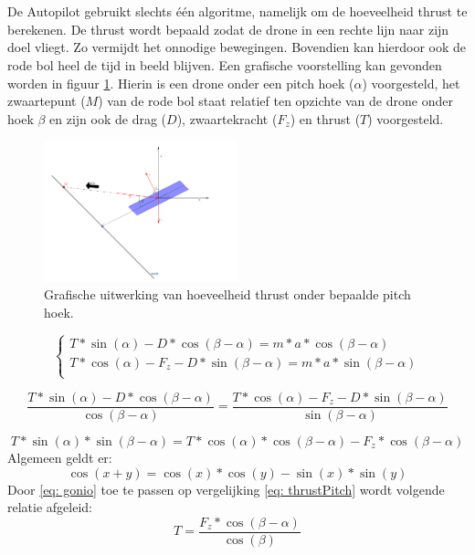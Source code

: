 \\
\\
De Autopilot gebruikt slechts één algoritme, namelijk om de hoeveelheid thrust te berekenen. De thrust wordt bepaald zodat de drone in een rechte lijn naar zijn doel vliegt. Zo vermijdt het onnodige bewegingen. Bovendien kan hierdoor ook de rode bol heel de tijd in beeld blijven. Een grafische voorstelling kan gevonden worden in figuur \ref{fig:GrafischeUitwerkingVanHoeveelheidThrustOnderBepaaldePitch}. Hierin is een drone onder een pitch hoek (\(\alpha\)) voorgesteld, het zwaartepunt (\(M\)) van de rode bol staat relatief ten opzichte van de drone onder hoek \(\beta\) en zijn ook de drag (\(D\)), zwaartekracht (\(F_z\)) en thrust (\(T\)) voorgesteld.

\begin{figure}[h]
	\centering
	\includegraphics[width=0.5\textwidth]{GrafischeUitwerkingVanHoeveelheidThrustOnderBepaaldePitch.png}
	\caption{Grafische uitwerking van hoeveelheid thrust onder bepaalde pitch hoek.}
	\label{fig:GrafischeUitwerkingVanHoeveelheidThrustOnderBepaaldePitch}
\end{figure}

\begin{equation}
\begin{cases}
T*\sin(\alpha)-D*\cos(\beta-\alpha) = m*a*\cos(\beta-\alpha)\\
T*\cos(\alpha) - F_z - D*\sin(\beta-\alpha) = m*a*\sin(\beta-\alpha)\\
\end{cases}
\end{equation}

\begin{equation}
\frac{T*\sin(\alpha)-D*\cos(\beta-\alpha)}{\cos(\beta-\alpha)} = \frac{T*\cos(\alpha) - F_z - D*\sin(\beta-\alpha)}{\sin(\beta-\alpha)}
\end{equation}

\begin{equation} \label{eq: thrustPitch}
T*\sin(\alpha)*\sin(\beta-\alpha) = T*\cos(\alpha)*\cos(\beta-\alpha)- F_z*\cos(\beta-\alpha)
\end{equation}
Algemeen geldt er:
\begin{equation} \label{eq: gonio}
\cos(x+y) = \cos(x)*\cos(y)-\sin(x)*\sin(y)
\end{equation}
Door \ref{eq: gonio} toe te passen op vergelijking \ref{eq: thrustPitch} wordt volgende relatie afgeleid:
\begin{equation}
T = \frac{ F_z*\cos(\beta-\alpha)}{\cos(\beta)}
\end{equation}


